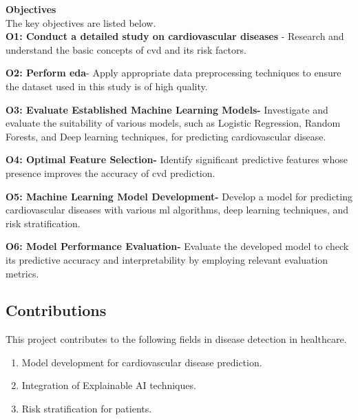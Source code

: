 \noindent \textbf  {Objectives } \\
The key objectives are listed below. \\

\noindent \textbf{O1: Conduct a detailed study on cardiovascular diseases} - Research and understand the basic concepts of \gls{cvd} and its risk factors.

\noindent \textbf{O2: Perform \gls{eda}}- Apply appropriate data preprocessing techniques to ensure the dataset used in this study is of high quality.

\noindent \textbf{O3: Evaluate Established Machine Learning Models-} Investigate and evaluate the suitability of various models, such as Logistic Regression, Random Forests, and Deep learning techniques, for predicting cardiovascular disease. 

\noindent \textbf{O4: Optimal Feature Selection-} Identify significant predictive features whose presence improves the accuracy of \gls{cvd} prediction.

\noindent \textbf{O5: Machine Learning Model Development- }Develop a model for predicting cardiovascular diseases with various \gls{ml} algorithms, deep learning techniques, and risk stratification.

\noindent \textbf{O6: Model Performance Evaluation-} Evaluate the developed model to check its predictive accuracy and interpretability by employing relevant evaluation metrics.


\subsection{Contributions}
\label{sec:intro_contrib}

This project contributes to the following fields in disease detection in healthcare. 
\begin{enumerate}
    \item Model development for cardiovascular disease prediction.
    \item Integration of Explainable AI techniques.
    \item Risk stratification for patients.
\end{enumerate}

